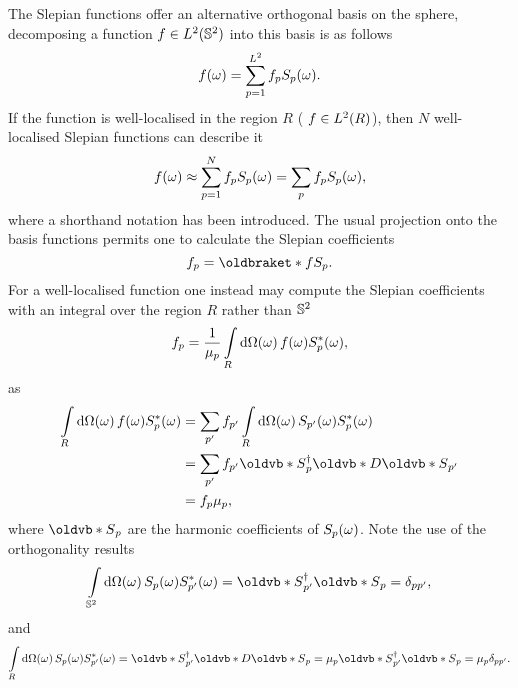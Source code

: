 The Slepian functions offer an alternative orthogonal basis on the sphere, decomposing a function \(f \in L^{2}(\mathbb{S}^{2})\) into this basis is as follows
%
\begin{equation}
	f(\omega)
	= \sum\limits_{p=1}^{L^{2}} {f}_{p}{S}_{p}(\omega).
\end{equation}
%
If the function is well-localised in the region \(R\) (\ie{} \(f \in L^{2}(R)\)), then \(N\) well-localised Slepian functions can describe it
%
\begin{equation}\label{eq:chapter3_slepian_inverse}
	f(\omega)
	\approx \sum\limits_{p=1}^{N} {f}_{p}{S}_{p}(\omega) \\
	= \sum\limits_{p} {f}_{p}{S}_{p}(\omega),
\end{equation}
%
where a shorthand notation has been introduced.
The usual projection onto the basis functions permits one to calculate the Slepian coefficients
%
\begin{equation}
	\slepian{f}
	= \braket{f}{\slepian{S}}.
\end{equation}
%
For a well-localised function one instead may compute the Slepian coefficients with an integral over the region \(R\) rather than \(\mathbb{S}^{2}{}\)
%
\begin{equation}
	{f}_{p}
	= \frac{1}{{\mu}_{p}} \int\limits_{R} \dd{\Omega(\omega)} f(\omega) {S}_{p}^{\ast}(\omega),
\end{equation}
%
as
%
\begin{align}
	\integrateRegion{\sphereVolume} \pixel{f} \pixel{\conj{\slepian{S}}}
	 & = \slepianSum['] \slepian[']{f} \integrateRegion{\sphereVolume} \pixel{\slepian[']{S}} \pixel{\conj{\slepian{S}}} \nonumber \\
	 & = \slepianSum['] \slepian[']{f} \hermitian{\slepian{\vb{S}}} \vb{D} \slepian[']{\vb{S}} \nonumber                             \\
	 & = \slepian{f} \slepian{\mu},
\end{align}
%
where \(\slepian{\vb{S}}\) are the harmonic coefficients of \({S}_{p}(\omega)\).
Note the use of the orthogonality results
%
\begin{equation}\label{eq:chapter3_orthogonality_sphere}
	\integrateSphere{\omega} \pixel{\slepian{S}} \pixel{\conj{\slepian[']{S}}}
	= \hermitian{\slepian[']{\vb{S}}} \slepian{\vb{S}}
	= \delta_{pp'},
\end{equation}
%
and
%
\begin{equation}
	\integrateRegion{\sphereVolume} \pixel{\slepian{S}} \pixel{\conj{\slepian[']{S}}}
	= \hermitian{\slepian[']{\vb{S}}} \vb{D} \slepian{\vb{S}}
	= \slepian{\mu} \hermitian{\slepian[']{\vb{S}}} \slepian{\vb{S}}
	= \slepian{\mu} \delta_{pp'}.
\end{equation}

